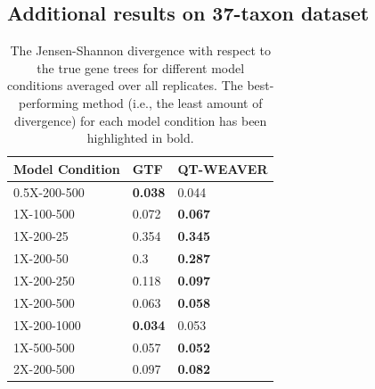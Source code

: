\documentclass[10pt,a4paper]{article}
\begin{document}
\begin{appendices}
\subsection{Additional results on 37-taxon dataset}
\label{app:37-taxon}

\begin{table}[h!]
    \centering
    \caption{The Jensen-Shannon divergence with respect to the true gene trees for different model conditions averaged over all replicates. The best-performing method (i.e., the least amount of divergence) for each model condition has been highlighted in bold.}
    \label{tab:37-divergence}
    \begin{tabular}{|C{3cm}|C{3cm}|C{3cm}|}
        \hline
        \textbf{Model Condition} & \textbf{GTF} & \textbf{QT-WEAVER} \\
        \hline
        0.5X-200-500 & \textbf{0.038} & 0.044 \\
        \hline
        1X-100-500 & 0.072 & \textbf{0.067} \\
        \hline
        1X-200-25 & 0.354 & \textbf{0.345} \\
        \hline
        1X-200-50 & 0.3 & \textbf{0.287} \\
        \hline
        1X-200-250 & 0.118 & \textbf{0.097} \\
        \hline
        1X-200-500 & 0.063 & \textbf{0.058} \\
        \hline
        1X-200-1000 & \textbf{0.034} & 0.053 \\
        \hline
        1X-500-500 & 0.057 & \textbf{0.052} \\
        \hline
        2X-200-500 & 0.097 & \textbf{0.082} \\
        \hline
    \end{tabular}
\end{table}


\end{appendices}
\end{document}
